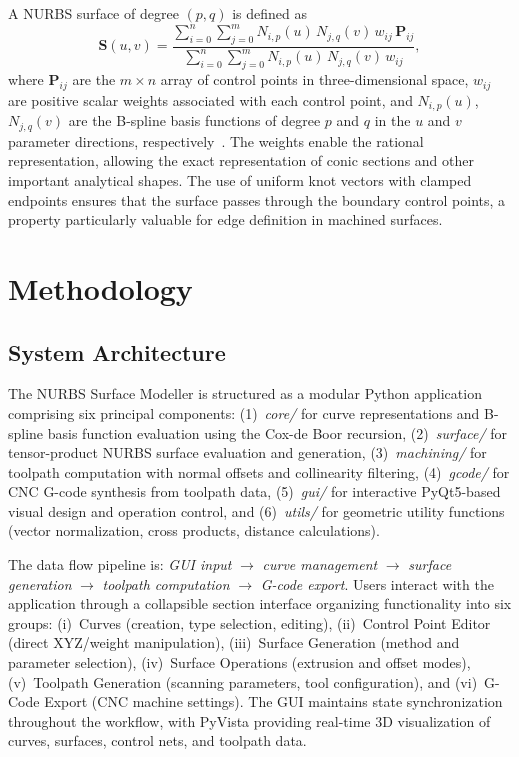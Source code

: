\documentclass[a4paper,12pt]{article}
\begin{document}
A NURBS surface of degree $(p, q)$ is defined as
\begin{equation}
  \mathbf{S}(u,v) =
    \frac{\displaystyle\sum_{i=0}^{n}\sum_{j=0}^{m}
          N_{i,p}(u)\,N_{j,q}(v)\,w_{ij}\,\mathbf{P}_{ij}}
         {\displaystyle\sum_{i=0}^{n}\sum_{j=0}^{m}
          N_{i,p}(u)\,N_{j,q}(v)\,w_{ij}},
  \label{eq:nurbs}
\end{equation}
where $\mathbf{P}_{ij}$ are the $m \times n$ array of control points in
three-dimensional space, $w_{ij}$ are positive scalar weights associated with
each control point, and $N_{i,p}(u)$, $N_{j,q}(v)$ are the B-spline basis
functions of degree $p$ and $q$ in the $u$ and $v$ parameter directions,
respectively~\cite{ref1}. The weights enable the rational representation,
allowing the exact representation of conic sections and other important
analytical shapes. The use of uniform knot vectors with clamped endpoints
ensures that the surface passes through the boundary control points, a
property particularly valuable for edge definition in machined surfaces.

\section{Methodology}

\subsection{System Architecture}

The NURBS Surface Modeller is structured as a modular Python application
comprising six principal components: (1)~\emph{core/} for curve representations
and B-spline basis function evaluation using the Cox-de Boor recursion,
(2)~\emph{surface/} for tensor-product NURBS surface evaluation and generation,
(3)~\emph{machining/} for toolpath computation with normal offsets and
collinearity filtering, (4)~\emph{gcode/} for CNC G-code synthesis from
toolpath data, (5)~\emph{gui/} for interactive PyQt5-based visual design and
operation control, and (6)~\emph{utils/} for geometric utility functions
(vector normalization, cross products, distance calculations).

The data flow pipeline is: \emph{GUI input} $\rightarrow$ \emph{curve
management} $\rightarrow$ \emph{surface generation} $\rightarrow$
\emph{toolpath computation} $\rightarrow$ \emph{G-code export}. Users interact
with the application through a collapsible section interface organizing
functionality into six groups: (i)~Curves (creation, type selection, editing),
(ii)~Control Point Editor (direct XYZ/weight manipulation), (iii)~Surface
Generation (method and parameter selection), (iv)~Surface Operations
(extrusion and offset modes), (v)~Toolpath Generation (scanning parameters,
tool configuration), and (vi)~G-Code Export (CNC machine settings). The GUI
maintains state synchronization throughout the workflow, with PyVista
providing real-time 3D visualization of curves, surfaces, control nets, and
toolpath data.
\end{document}
